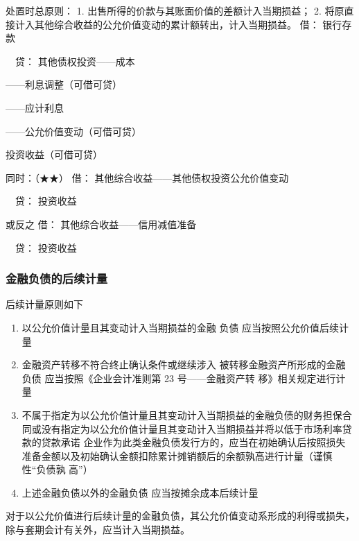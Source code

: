 \documentclass[UTF8,12pt]{ctexart}
\newenvironment{Dr}{\noindent 借：}{\par}
\newenvironment{Cr}{\noindent \ \ 贷：}{\par}
\numberwithin{equation}{section} %
\numberwithin{figure}{section}
\numberwithin{table}{section}
\begin{document}
	
	处置时总原则：
	1.	出售所得的价款与其账面价值的差额计入当期损益；
	2.	将原直接计入其他综合收益的公允价值变动的累计额转出，计入当期损益。
	\begin{Dr}
		银行存款
	\end{Dr}
	\begin{Cr}
		其他债权投资——成本
		
		——利息调整（可借可贷）
		
		——应计利息
		
		——公允价值变动（可借可贷） 
		
		投资收益（可借可贷）
	\end{Cr}

	同时：（★★）
	\begin{Dr}
		其他综合收益——其他债权投资公允价值变动
	\end{Dr}
	\begin{Cr}
		投资收益
	\end{Cr}
	或反之
	\begin{Dr}
		其他综合收益——信用减值准备
	\end{Dr}
	\begin{Cr}
		投资收益
	\end{Cr}
	
	
	
	
	
	\subsubsection{金融负债的后续计量}
	后续计量原则如下
	\begin{enumerate}
		\item 以公允价值计量且其变动计入当期损益的金融
		负债	应当按照公允价值后续计量
		
		\item 金融资产转移不符合终止确认条件或继续涉入
		被转移金融资产所形成的金融负债	应当按照《企业会计准则第 23 号——金融资产转
		移》相关规定进行计量
		
		\item 不属于指定为以公允价值计量且其变动计入当期损益的金融负债的财务担保合同或没有指定为以公允价值计量且其变动计入当期损益并将以低于市场利率贷款的贷款承诺	企业作为此类金融负债发行方的，应当在初始确认后按照损失准备金额以及初始确认金额扣除累计摊销额后的余额孰高进行计量（谨慎性“负债孰
		高”）
		
		\item 上述金融负债以外的金融负债	应当按摊余成本后续计量
	\end{enumerate}
	
	对于以公允价值进行后续计量的金融负债，其公允价值变动系形成的利得或损失，除与套期会计有关外，应当计入当期损益。
	
\end{document}
